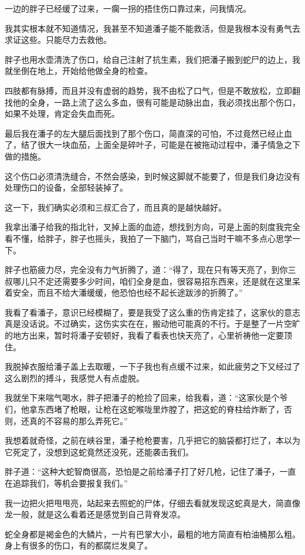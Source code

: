 一边的胖子已经缓了过来，一瘸一拐的捂住伤口靠过来，问我情况。

我其实根本就不知道情况，我甚至不知道潘子能不能救活，但是我根本没有勇气去求证这些。只能尽力去救他。

胖子也用水壶清洗了伤口，给自己注射了抗生素，我们把潘子搬到蛇尸的边上，我就坐倒在地上，开始给他做全身的检查。

四肢都有脉搏，而且并没有虚弱的趋势，我不由松了口气，但是不敢放松，立即翻找他的全身，一路上流了这么多血，很有可能是动脉出血，我必须找出那个伤口，如果不处理，肯定会失血而死。

最后我在潘子的左大腿后面找到了那个伤口，简直深的可怕，不过竟然已经止血了，结了很大一块血茄，上面全是碎叶子，可能是在被拖动过程中，潘子情急之下做的措施。

这个伤口必须清洗缝合，不然会感染，到时候这脚就不能要了，但是我们身边没有处理伤口的设备，全部轻装掉了。

这一下，我们确实必须和三叔汇合了，而且真的是越快越好。

我拿出潘子给我的指北针，叉掉上面的血迹，想找到方向，可是上面的刻度我完全看不懂，给胖子，胖子也摇头，我拍了一下脑门，骂自己当时干嘛不多点心思学一下。

胖子也筋疲力尽，完全没有力气折腾了，道：“得了，现在只有等天亮了，到你三叔哪儿只不定还需要多少时间，咱们全身是血，很容易招东西来，还是就在这里呆着安全，而且不给大潘缓缓，他恐怕也经不起长途跋涉的折腾了。”

我看了看潘子，意识已经模糊了，要是我受了这么重的伤肯定挂了，这家伙的意志真是没话说。不过确实，这伤实实在在，搬动他可能真的不行。于是整了一片空旷的地方出来，暂时将潘子安顿好，我看了看表也快天亮了，心里祈祷他一定要顶住。

我脱掉衣服给潘子盖上去取暖，一下子我也有点缓不过来，如此疲劳之下又经过了这么剧烈的搏斗，我感觉人有点虚脱。

我就坐下来喘气喝水，胖子把潘子的枪捡了回来，给我看，道：“这家伙是个爷们，他拿东西堵了枪眼，让枪在这蛇喉咙里炸膛了，把这蛇的脊柱给炸断了，否则，还真的不容易的那么弄死它。”

我想着就奇怪，之前在峡谷里，潘子枪枪要害，几乎把它的脑袋都打烂了，本以为它死定了，没想到这蛇竟然还没死，还能袭击我们。

胖子道：“这种大蛇智商很高，恐怕是之前给潘子打了好几枪，记住了潘子，一直在追踪我们，等机会要报复我们。”

我一边把火把甩甩亮，站起来去照蛇的尸体，仔细去看就发现这蛇真是大，简直像龙一般，就是这么看着还是感觉到自己背脊发凉。

蛇全身都是褐金色的大鳞片，一片有巴掌大小，最粗的地方简直有柏油桶那么粗。身上有很多的伤口，有的都腐烂发臭了。

